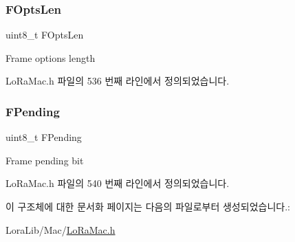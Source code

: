 \subsubsection{\texorpdfstring{F\+Opts\+Len}{FOptsLen}}
{\footnotesize\ttfamily uint8\+\_\+t F\+Opts\+Len}

Frame options length 

Lo\+Ra\+Mac.\+h 파일의 536 번째 라인에서 정의되었습니다.

\mbox{\label{structu_lo_ra_mac_frame_ctrl_1_1s_ctrl_bits_a2d5d8f602343aff45f870d4c38ffa0df}} 
\subsubsection{\texorpdfstring{F\+Pending}{FPending}}
{\footnotesize\ttfamily uint8\+\_\+t F\+Pending}

Frame pending bit 

Lo\+Ra\+Mac.\+h 파일의 540 번째 라인에서 정의되었습니다.



이 구조체에 대한 문서화 페이지는 다음의 파일로부터 생성되었습니다.\+:\begin{DoxyCompactItemize}
\item 
Lora\+Lib/\+Mac/\mbox{\hyperlink{_lo_ra_mac_8h}{Lo\+Ra\+Mac.\+h}}\end{DoxyCompactItemize}
